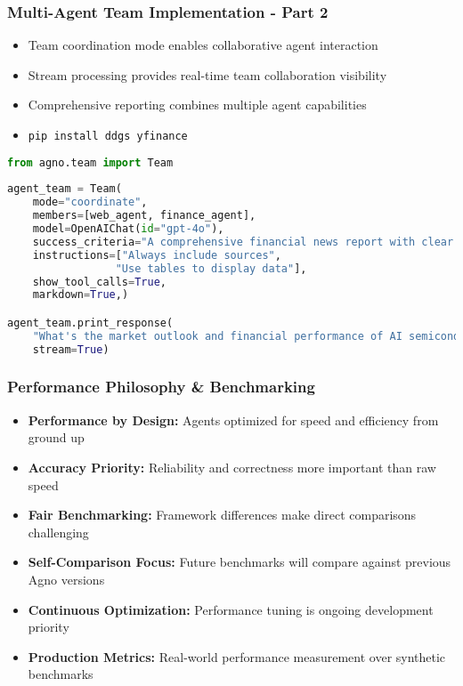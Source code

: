 \begin{frame}[fragile]\frametitle{Multi-Agent Team Implementation - Part 2}
      \begin{itemize}
	\item Team coordination mode enables collaborative agent interaction
	\item Stream processing provides real-time team collaboration visibility
	\item Comprehensive reporting combines multiple agent capabilities
	\item \lstinline|pip install ddgs yfinance|
	  \end{itemize}
      
      \begin{lstlisting}[language=python, basicstyle=\tiny]
from agno.team import Team
	  
agent_team = Team(
    mode="coordinate",
    members=[web_agent, finance_agent],
    model=OpenAIChat(id="gpt-4o"),
    success_criteria="A comprehensive financial news report with clear sections and data-driven insights.",
    instructions=["Always include sources", 
                 "Use tables to display data"],
    show_tool_calls=True,
    markdown=True,)

agent_team.print_response(
    "What's the market outlook and financial performance of AI semiconductor companies?", 
    stream=True)

      \end{lstlisting}
\end{frame}

\begin{frame}[fragile]\frametitle{Performance Philosophy \& Benchmarking}
      \begin{itemize}
	\item \textbf{Performance by Design:} Agents optimized for speed and efficiency from ground up
	\item \textbf{Accuracy Priority:} Reliability and correctness more important than raw speed
	\item \textbf{Fair Benchmarking:} Framework differences make direct comparisons challenging
	\item \textbf{Self-Comparison Focus:} Future benchmarks will compare against previous Agno versions
	\item \textbf{Continuous Optimization:} Performance tuning is ongoing development priority
	\item \textbf{Production Metrics:} Real-world performance measurement over synthetic benchmarks
	  \end{itemize}
\end{frame}

